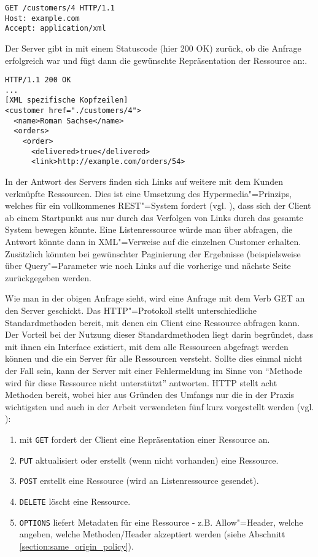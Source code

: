 \begin{lstlisting}
GET /customers/4 HTTP/1.1
Host: example.com
Accept: application/xml 
\end{lstlisting}
Der Server gibt in mit einem Statuscode (hier 200 OK) zurück, ob die Anfrage erfolgreich war und fügt dann die gewünschte Repräsentation der Ressource an:.
\begin{lstlisting}
HTTP/1.1 200 OK
...
[XML spezifische Kopfzeilen]
<customer href="./customers/4">
  <name>Roman Sachse</name>
  <orders>
    <order>
      <delivered>true</delivered>
      <link>http://example.com/orders/54>
\end{lstlisting}
In der Antwort des Servers finden sich Links auf weitere mit dem Kunden verknüpfte Ressourcen. Dies ist eine Umsetzung des Hypermedia"=Prinzips, welches für ein vollkommenes \ac{REST}"=System fordert (vgl. \cite{tilkovrest}), dass sich der Client ab einem Startpunkt aus nur durch das Verfolgen von Links durch das gesamte System bewegen könnte. Eine Listenressource würde man über  abfragen, die Antwort könnte dann in \ac{XML}"=Verweise auf die einzelnen Customer erhalten. Zusätzlich könnten bei gewünschter Paginierung der Ergebnisse (beispielsweise über Query"=Parameter wie  noch Links auf die vorherige und nächste Seite zurückgegeben werden.

Wie man in der obigen Anfrage sieht, wird eine Anfrage mit dem Verb GET an den Server geschickt. Das \ac{HTTP}"=Protokoll stellt unterschiedliche Standardmethoden bereit, mit denen ein Client eine Ressource abfragen kann. Der Vorteil bei der Nutzung dieser Standardmethoden liegt darin begründet, dass mit ihnen ein Interface existiert, mit dem alle Ressourcen abgefragt werden können und die ein Server für alle Ressourcen versteht. Sollte dies einmal nicht der Fall sein, kann der Server mit einer Fehlermeldung im Sinne von "`Methode wird für diese Ressource nicht unterstützt"' antworten. \ac{HTTP} stellt acht Methoden bereit, wobei hier aus Gründen des Umfangs nur die in der Praxis wichtigsten und auch in der Arbeit verwendeten fünf kurz vorgestellt werden (vgl. \cite{tilkovrest}):
\begin{enumerate}
 \item mit \texttt{GET} fordert der Client eine Repräsentation einer Ressource an.
 \item \texttt{PUT} aktualisiert oder erstellt (wenn nicht vorhanden) eine Ressource. 
 \item \texttt{POST} erstellt eine Ressource (wird an Listenressource gesendet).
 \item \texttt{DELETE} löscht eine Ressource.
 \item \texttt{OPTIONS} liefert Metadaten für eine Ressource - z.B. Allow"=Header, welche angeben, welche Methoden/Header akzeptiert werden (siehe Abschnitt \ref{section:same_origin_policy}).
\end{enumerate}

